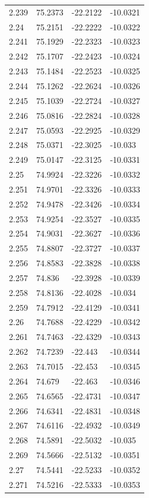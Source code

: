 \begin{tabular}{llll}
2.239 & 75.2373 & -22.2122 & -10.0321 \\
2.24 & 75.2151 & -22.2222 & -10.0322 \\
2.241 & 75.1929 & -22.2323 & -10.0323 \\
2.242 & 75.1707 & -22.2423 & -10.0324 \\
2.243 & 75.1484 & -22.2523 & -10.0325 \\
2.244 & 75.1262 & -22.2624 & -10.0326 \\
2.245 & 75.1039 & -22.2724 & -10.0327 \\
2.246 & 75.0816 & -22.2824 & -10.0328 \\
2.247 & 75.0593 & -22.2925 & -10.0329 \\
2.248 & 75.0371 & -22.3025 & -10.033 \\
2.249 & 75.0147 & -22.3125 & -10.0331 \\
2.25 & 74.9924 & -22.3226 & -10.0332 \\
2.251 & 74.9701 & -22.3326 & -10.0333 \\
2.252 & 74.9478 & -22.3426 & -10.0334 \\
2.253 & 74.9254 & -22.3527 & -10.0335 \\
2.254 & 74.9031 & -22.3627 & -10.0336 \\
2.255 & 74.8807 & -22.3727 & -10.0337 \\
2.256 & 74.8583 & -22.3828 & -10.0338 \\
2.257 & 74.836 & -22.3928 & -10.0339 \\
2.258 & 74.8136 & -22.4028 & -10.034 \\
2.259 & 74.7912 & -22.4129 & -10.0341 \\
2.26 & 74.7688 & -22.4229 & -10.0342 \\
2.261 & 74.7463 & -22.4329 & -10.0343 \\
2.262 & 74.7239 & -22.443 & -10.0344 \\
2.263 & 74.7015 & -22.453 & -10.0345 \\
2.264 & 74.679 & -22.463 & -10.0346 \\
2.265 & 74.6565 & -22.4731 & -10.0347 \\
2.266 & 74.6341 & -22.4831 & -10.0348 \\
2.267 & 74.6116 & -22.4932 & -10.0349 \\
2.268 & 74.5891 & -22.5032 & -10.035 \\
2.269 & 74.5666 & -22.5132 & -10.0351 \\
2.27 & 74.5441 & -22.5233 & -10.0352 \\
2.271 & 74.5216 & -22.5333 & -10.0353 \\

\end{tabular}
